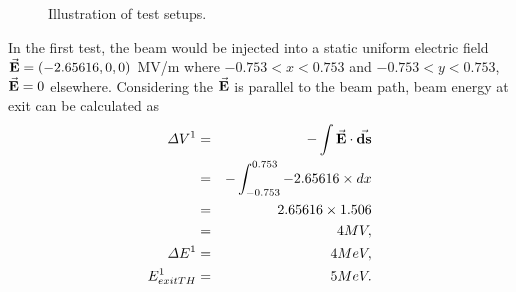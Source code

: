 \documentclass[a4paper,oneside,12pt]{report}
\numberwithin{equation}{chapter}
\begin{document}
\vspace{10pt}
\begin{figure}[H]
    \centering
    \qquad{}%
    \vspace{15pt}
    \caption{Illustration of test setups.}
\end{figure}
\clearpage
In the first test, the beam would be injected into a static uniform electric field \\
$\vec{\textbf{E}}=(-2.65616, 0, 0)$ MV/m where $-0.753<x<0.753$ and $-0.753<y<0.753$, $\vec{\textbf{E}}=0$ elsewhere.
Considering the $\vec{\textbf{E}}$ is parallel to the beam path, beam energy at exit can be calculated as
\vspace{-10pt}\begin{eqnarray}
    \Delta V^1 &=& - \int \dotProdBF{E}{ds} \nonumber\\
             &=& - \int_{-0.753}^{0.753} -2.65616 \times dx \nonumber\\
             &=& 2.65616 \times 1.506 \nonumber\\
             &=& 4 MV, \\
    \Delta E^1 &=& 4 MeV, \\
    E_{exitTH}^1 &=& 5 MeV.
\vspace{-10pt}\end{eqnarray}
\end{document}
